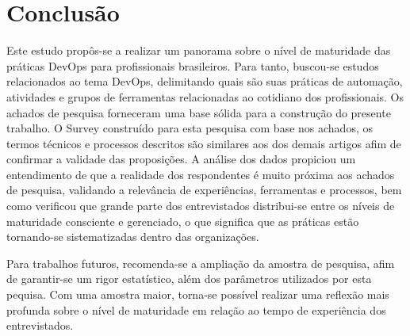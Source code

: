 \documentclass[twoside,english,brazilian]{UNISINOSartigo}
\begin{document}
\section{Conclusão}
Este estudo propôs-se a realizar um panorama sobre o nível de maturidade das práticas DevOps para profissionais brasileiros. Para tanto, buscou-se estudos relacionados ao tema DevOps, delimitando quais são suas práticas de automação, atividades e grupos de ferramentas relacionadas ao cotidiano dos profissionais. Os achados de pesquisa forneceram uma base sólida para a construção do presente trabalho. O Survey construído para esta pesquisa com base nos achados, os termos técnicos e processos descritos são similares aos dos demais artigos afim de confirmar a validade das proposições. A análise dos dados propiciou um entendimento de que a realidade dos respondentes é muito próxima aos achados de pesquisa, validando a relevância de experiências, ferramentas e processos, bem como verificou que grande parte dos entrevistados distribui-se entre os níveis de maturidade consciente e gerenciado, o que significa que as práticas estão tornando-se sistematizadas dentro das organizações.

Para trabalhos futuros, recomenda-se a ampliação da amostra de pesquisa, afim de garantir-se um rigor estatístico, além dos parâmetros utilizados por esta pequisa. Com uma amostra maior, torna-se possível realizar uma reflexão mais profunda sobre o nível de maturidade em relação ao tempo de experiência dos entrevistados.

%










\appendix


\end{document}

